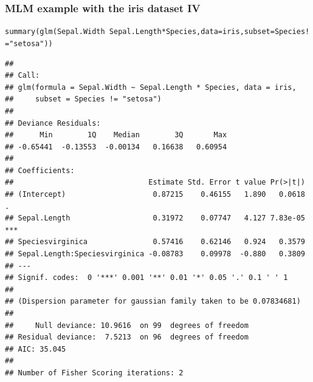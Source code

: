 \documentclass[xcolor=table, xcolor=dvipsnames]{beamer}\usepackage[]{graphicx}\usepackage[]{color}
\makeatletter
\newcommand{\hlstr}[1]{\textcolor[rgb]{0.545,0.137,0.137}{#1}}
\newcommand{\hlopt}[1]{\textcolor[rgb]{0,0,0}{#1}}
\newcommand{\hlstd}[1]{\textcolor[rgb]{0,0,0}{#1}}
\newcommand{\hlkwc}[1]{\textcolor[rgb]{1,0,1}{#1}}
\newcommand{\hlkwd}[1]{\textcolor[rgb]{0,0,1}{#1}}
\newenvironment{kframe}{%
 \def\at@end@of@kframe{}%
 \ifinner\ifhmode%
  \def\at@end@of@kframe{\end{minipage}}%
  \begin{minipage}{\columnwidth}%
 \fi\fi%
 \def\FrameCommand##1{\hskip\@totalleftmargin \hskip-\fboxsep
 \colorbox{shadecolor}{##1}\hskip-\fboxsep
     \hskip-\linewidth \hskip-\@totalleftmargin \hskip\columnwidth}%
 \MakeFramed {\advance\hsize-\width
   \@totalleftmargin\z@ \linewidth\hsize
   \@setminipage}}%
 {\par\unskip\endMakeFramed%
 \at@end@of@kframe}
\newenvironment{knitrout}{}{} %
\newcommand{\rcode}[1]{\texttt{\textcolor{Blue}{#1}}} %
\makeatother
\begin{document}

\begin{frame}[fragile]\frametitle{MLM example with the iris dataset IV}


\begin{knitrout}\tiny
{}\color{fgcolor}\begin{kframe}
\begin{alltt}
 \hlkwd{summary}\hlstd{(}\hlkwd{glm}\hlstd{(Sepal.Width} \hlopt{~} \hlstd{Sepal.Length} \hlopt{*} \hlstd{Species,} \hlkwc{data}\hlstd{=iris,} \hlkwc{subset}\hlstd{=Species}\hlopt{!=}\hlstr{"setosa"}\hlstd{))}
\end{alltt}
\begin{verbatim}
## 
## Call:
## glm(formula = Sepal.Width ~ Sepal.Length * Species, data = iris, 
##     subset = Species != "setosa")
## 
## Deviance Residuals: 
##      Min        1Q    Median        3Q       Max  
## -0.65441  -0.13553  -0.00134   0.16638   0.60954  
## 
## Coefficients:
##                               Estimate Std. Error t value Pr(>|t|)    
## (Intercept)                    0.87215    0.46155   1.890   0.0618 .  
## Sepal.Length                   0.31972    0.07747   4.127 7.83e-05 ***
## Speciesvirginica               0.57416    0.62146   0.924   0.3579    
## Sepal.Length:Speciesvirginica -0.08783    0.09978  -0.880   0.3809    
## ---
## Signif. codes:  0 '***' 0.001 '**' 0.01 '*' 0.05 '.' 0.1 ' ' 1
## 
## (Dispersion parameter for gaussian family taken to be 0.07834681)
## 
##     Null deviance: 10.9616  on 99  degrees of freedom
## Residual deviance:  7.5213  on 96  degrees of freedom
## AIC: 35.045
## 
## Number of Fisher Scoring iterations: 2
\end{verbatim}
\end{kframe}
\end{knitrout}

\end{frame}

\end{document}
